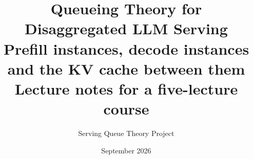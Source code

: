 
\title{Queueing Theory for Disaggregated LLM Serving\\[0.4em]
\large Prefill instances, decode instances and the KV cache between them\\[0.2em]
\normalsize Lecture notes for a five-lecture course}
\author{Serving Queue Theory Project}
\date{September 2026}

\hypersetup{pageanchor=false}
\maketitle
\hypersetup{pageanchor=true}
{\linespread{0.92}\selectfont\tableofcontents}








